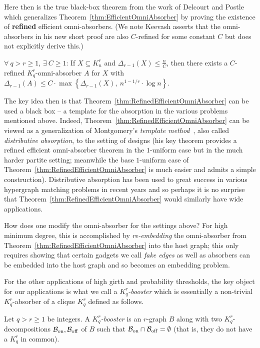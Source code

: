 \documentclass[twoside,leqno]{article}
\begin{document}
Here then is the true black-box theorem from the work of Delcourt and Postle~\cite{DPI} which generalizes Theorem~\ref{thm:EfficientOmniAbsorber} by proving the existence of \textbf{refined} efficient omni-absorbers. (We note Keevash asserts that the omni-absorbers in his new short proof are also $C$-refined for some constant $C$ but does not explicitly derive this.)

\begin{thm}\label{thm:RefinedEfficientOmniAbsorber}
$\forall~q > r \ge 1$, $\exists~C\ge 1$: If $X\subseteq  K_n^r$ and $\Delta_{r-1}(X) \le \frac{n}{C}$, then there exists a $C$-refined $K_q^r$-omni-absorber $A$ for $X$ with $\Delta_{r-1}(A) \le C\cdot \max\left\{\Delta_{r-1}(X),~n^{1-1/r}\cdot \log n\right\}$.     
\end{thm}

The key idea then is that Theorem~\ref{thm:RefinedEfficientOmniAbsorber} can be used a black box -- a template for the absorption in the various problems mentioned above. Indeed, Theorem~\ref{thm:RefinedEfficientOmniAbsorber} can be viewed as a generalization of Montgomery's \emph{template method}~\cite{M19b}, also called \emph{distributive absorption}, to the setting of designs (his key theorem provides a refined efficient omni-absorber theorem in the $1$-uniform case but in the much harder partite setting; meanwhile the base $1$-uniform case of Theorem~\ref{thm:RefinedEfficientOmniAbsorber} is much easier and admits a simple construction). Distributive absorption has been used to great success in various hypergraph matching problems in recent years and so perhaps it is no surprise that Theorem~\ref{thm:RefinedEfficientOmniAbsorber} would similarly have wide applications. 

How does one modify the omni-absorber for the settings above? For high minimum degree, this is accomplished by \emph{re-embedding} the omni-absorber from Theorem~\ref{thm:RefinedEfficientOmniAbsorber} into the host graph; this only requires showing that certain gadgets we call \emph{fake edges} as well as absorbers can be embedded into the host graph and so becomes an embedding problem.

For the other applications of high girth and probability thresholds, the key object for our applications is what we call a \emph{$K_q^r$-booster} which is essentially a non-trivial $K_q^r$-absorber of a clique $K_q^r$ defined as follows.

\begin{definition}[Booster]Let $q > r\ge 1$ be integers. A \emph{$K_q^r$-booster} is an $r$-graph $B$ along with two $K_q^r$-decompositions $\mathcal{B}_{\rm on},\mathcal{B}_{\rm off}$ of $B$ such that $\mathcal{B}_{\rm on}\cap \mathcal{B}_{\rm off} =\emptyset$ (that is, they do not have a $K_q^r$ in common). \end{definition}
\end{document}
